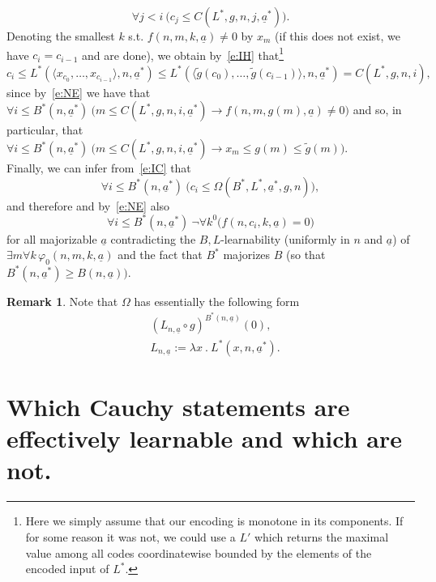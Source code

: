 \documentclass[1p]{elsarticle}
\newcommand{\tup}{\underline} %
\theoremstyle{plain}
\theoremstyle{definition}
\newtheorem{rmk}[thm]{Remark}
\theoremstyle{remark}
\renewenvironment{proof}[1][]{\noindent{\bf Proof{#1}. }}{\nopagebreak[4]{\hspace*{\fill}
  $\Box$              %
 }{\vspace{2ex}}}
\theoremstyle{definition}
\begin{document}
{\begin{proof}
\[ \forall j<i\ \big(c_j\leq C(L^*,g,n,j,\underline{a}^*)\big). \tag{IH}\label{e:IH}\]
Denoting the smallest $k$ s.t. $f(n,m,k,\underline{a})\neq0$ by $x_m$ 
(if this does not exist, we have $c_i=c_{i-1}$ and are done), 
we obtain by~\eqref{e:IH} that\footnote{Here
we simply assume that our encoding is monotone in its components. If for some reason it was not, we could use a $L'$ which returns
the maximal value among all codes coordinatewise bounded by the elements of the encoded input of $L^*$.}
\[
   c_i\leq L^*(\langle x_{c_0},\ldots,x_{c_{i-1}}\rangle, n,\underline{a}^*)
   \leq L^*(\langle \tilde g({c_0}),\ldots,\tilde g({c_{i-1}})\rangle, n,\underline{a}^*)=C(L^*,g,n,i),
\]
since by~\eqref{e:NE} we have that $\forall i\leq B^*(n,\underline{a}^*)\ 
\big(m\leq C(L^*,g,n,i,\underline{a}^*)\rightarrow f(n,m,g(m),\underline{a})\neq0 \big)$ and 
so, in particular, that
$\forall i\leq B^*(n,\underline{a}^*)\ \big(m\leq C(L^*,g,n,i,\underline{a}^*)
\rightarrow x_m\leq g(m)\leq \tilde g(m) \big)$.\\
Finally, we can infer from~\eqref{e:IC} that
\[ \forall i\leq B^*(n,\underline{a}^*)\ 
\big(c_i\leq \Omega(B^*,L^*,\underline{a}^*,g,n)\big),\]
and therefore and by~\eqref{e:NE} also
\[ \forall i\leq B^*(n,\underline{a}^*)\ \neg\forall k^0\big( 
f(n,c_i,k,\underline{a})=0\big) \]
for all majorizable $\underline{a}$ contradicting the $B,L$-learnability 
(uniformly in $n$ and $\underline{a}$) of 
$\exists m\forall k\,\varphi_0(n,m,k,\underline{a})$ and the fact that $B^*$ 
majorizes $B$ (so that $B^*(n,\underline{a}^*)\ge B(n,\underline{a})).$

\end{proof}

\begin{rmk}\label{r:metastr}
Note that $\Omega$ has essentially the following form
\begin{align*}
&(L_{n,\tup a}\circ g)^{B^*(n,\tup a)}(0),\\
&L_{n,\tup a}:=\lambda x\ .\ L^*(x,n,\tup a^*).
\end{align*}
\end{rmk}


\section{Which Cauchy statements are effectively learnable and which are not.}


}
\end{document}
